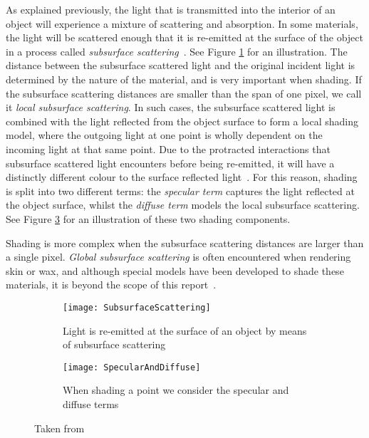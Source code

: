 As explained previously, the light that is transmitted into the interior of an object will experience a mixture of scattering and absorption. In some materials, the light will be scattered enough that it is re-emitted at the surface of the object in a process called \textit{subsurface scattering}~\cite{Spectroscopy}. See Figure \ref{fig:SubsurfaceScattering} for an illustration. The distance between the subsurface scattered light and the original incident light is determined by the nature of the material, and is very important when shading. If the subsurface scattering distances are smaller than the span of one pixel, we call it \textit{local subsurface scattering}. In such cases, the subsurface scattered light is combined with the light reflected from the object surface to form a local shading model, where the outgoing light at one point is wholly dependent on the incoming light at that same point. Due to the protracted interactions that subsurface scattered light encounters before being re-emitted, it will have a distinctly different colour to the surface reflected light~\cite{ReflectionFromLayeredSurfaces}. For this reason, shading is split into two different terms: the \textit{specular term} captures the light reflected at the object surface, whilst the \textit{diffuse term} models the local subsurface scattering. See Figure \ref{fig:SpecularAndDiffuse} for an illustration of these two shading components.

Shading is more complex when the subsurface scattering distances are larger than a single pixel. \textit{Global subsurface scattering} is often encountered when rendering skin or wax, and although special models have been developed to shade these materials, it is beyond the scope of this report~\cite{SeparableSubsurfaceScattering}.

\begin{figure}[h]
	\begin{subfigure}{0.48\textwidth}
		\texttt{[image: SubsurfaceScattering]}
		\caption{Light is re-emitted at the surface of an object by means of subsurface scattering}
		\label{fig:SubsurfaceScattering}
	\end{subfigure}
	\hspace*{\fill}
	\begin{subfigure}{0.48\textwidth}
		\texttt{[image: SpecularAndDiffuse]}
		\caption{When shading a point we consider the specular and diffuse terms}
		\label{fig:SpecularAndDiffuse}
	\end{subfigure}
	\caption{Taken from~\cite{RTR4}}
\end{figure}

